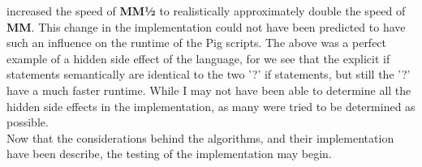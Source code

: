 \documentclass[../../main.tex]{subfiles}
\begin{document}
increased the speed of {\bf MM½} to realistically approximately double the speed of {\bf MM}. This change in the implementation could not have been predicted to have such an influence on the runtime of the Pig scripts. The above was a perfect example of a hidden side effect of the language, for we see that the explicit if statements semantically are identical to the two '?' if statements, but still the '?' have a much faster runtime. While I may not have been able to determine all the hidden side effects in the implementation, as many were tried to be determined as possible.\\

Now that the considerations behind the algorithms, and their implementation have been describe, the testing of the implementation may begin.
\end{document}

